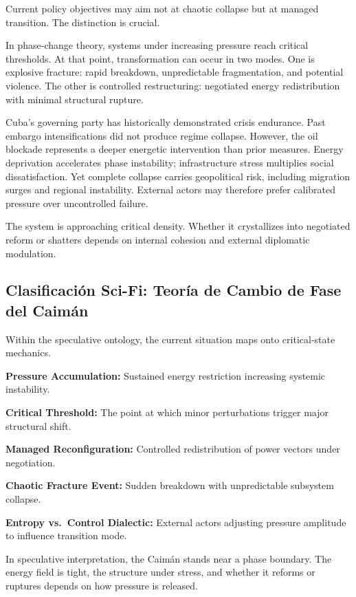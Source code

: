 \documentclass[12pt]{article}
\begin{document}
Current policy objectives may aim not at chaotic collapse but at managed transition. The distinction is crucial.

In phase-change theory, systems under increasing pressure reach critical thresholds. At that point, transformation can occur in two modes. One is explosive fracture: rapid breakdown, unpredictable fragmentation, and potential violence. The other is controlled restructuring: negotiated energy redistribution with minimal structural rupture.

Cuba's governing party has historically demonstrated crisis endurance. Past embargo intensifications did not produce regime collapse. However, the oil blockade represents a deeper energetic intervention than prior measures. Energy deprivation accelerates phase instability; infrastructure stress multiplies social dissatisfaction. Yet complete collapse carries geopolitical risk, including migration surges and regional instability. External actors may therefore prefer calibrated pressure over uncontrolled failure.

The system is approaching critical density. Whether it crystallizes into negotiated reform or shatters depends on internal cohesion and external diplomatic modulation.

\subsection*{Clasificación Sci-Fi: Teoría de Cambio de Fase del Caimán}

Within the speculative ontology, the current situation maps onto critical-state mechanics.

\textbf{Pressure Accumulation:} Sustained energy restriction increasing systemic instability.

\textbf{Critical Threshold:} The point at which minor perturbations trigger major structural shift.

\textbf{Managed Reconfiguration:} Controlled redistribution of power vectors under negotiation.

\textbf{Chaotic Fracture Event:} Sudden breakdown with unpredictable subsystem collapse.

\textbf{Entropy vs.\ Control Dialectic:} External actors adjusting pressure amplitude to influence transition mode.

In speculative interpretation, the Caimán stands near a phase boundary. The energy field is tight, the structure under stress, and whether it reforms or ruptures depends on how pressure is released.
\end{document}
